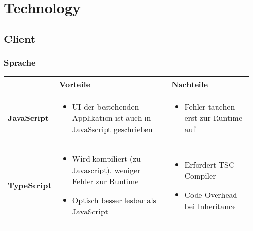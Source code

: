 \section{Technology}
	\subsection{Client}
		\subsubsection{Sprache}
			\begin{tabularx}{\textwidth}{|lXX|}
				\hline
					\textbf{} & \textbf{Vorteile} & \textbf{Nachteile}\\
				\hline
					\textbf{JavaScript} & 
					\begin{itemize}
						\item UI der bestehenden Applikation ist auch in JavaSscript geschrieben
					\end{itemize} & 
					\begin{itemize}
						\item Fehler tauchen erst zur Runtime auf
					\end{itemize} \\
				\hline
					\textbf{TypeScript} &
					\begin{itemize}
						\item Wird kompiliert (zu Javascript), weniger Fehler zur Runtime
						\item Optisch besser lesbar als JavaScript
					\end{itemize} &
					\begin{itemize}
						\item Erfordert TSC-Compiler
						\item Code Overhead bei Inheritance
					\end{itemize} \\
				\hline
			\end{tabularx}
			
			

